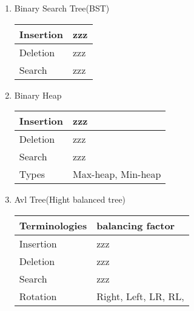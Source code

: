 \begin{enumerate}
    \item Binary Search Tree(BST) \\
        \begin{myTableStyle} \begin{tabular}{ |m{4cm}|m{12cm}| } \hline
                Insertion       &     zzz    \\ \hline
                Deletion        &     zzz    \\ \hline
                Search          &     zzz    \\ \hline
        \end{tabular} \end{myTableStyle} \vspace{0.08in}

    \item Binary Heap \\
        \begin{myTableStyle} \begin{tabular}{ |m{4cm}|m{12cm}| } \hline
                Insertion       &     zzz    \\ \hline
                Deletion        &     zzz    \\ \hline
                Search          &     zzz    \\ \hline
                Types           &     Max-heap, Min-heap    \\ \hline
        \end{tabular} \end{myTableStyle} \vspace{0.08in}

    \item Avl Tree(Hight balanced tree) \\
        \begin{myTableStyle} \begin{tabular}{ |m{4cm}|m{12cm}| } \hline
                Terminologies   &     balancing factor    \\ \hline
                Insertion       &     zzz    \\ \hline
                Deletion        &     zzz    \\ \hline
                Search          &     zzz    \\ \hline
                Rotation        &     Right, Left, LR, RL,     \\ \hline
        \end{tabular} \end{myTableStyle} \vspace{0.08in}


\end{enumerate}
